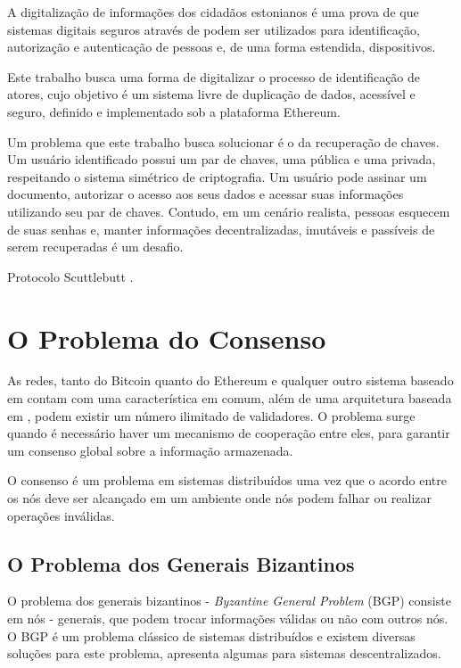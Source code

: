 \documentclass[tcc,capa]{texufpel}
\begin{document}
    A digitalização de informações dos cidadãos estonianos é uma prova de que sistemas digitais seguros através de \bchain podem ser utilizados para identificação, autorização e autenticação de pessoas e, de uma forma estendida, dispositivos.
    
    Este trabalho busca uma forma de digitalizar o processo de identificação de atores, cujo objetivo é um sistema livre de duplicação de dados, acessível e seguro, definido e implementado sob a plataforma Ethereum.
    
    Um problema que este trabalho busca solucionar é o da recuperação de chaves. Um usuário identificado possui um par de chaves, uma pública e uma privada, respeitando o sistema simétrico de criptografia. Um usuário pode assinar um documento, autorizar o acesso aos seus dados e acessar suas informações utilizando seu par de chaves. Contudo, em um cenário realista, pessoas esquecem de suas senhas e, manter informações decentralizadas, imutáveis e passíveis de serem recuperadas é um desafio.
    
    Protocolo Scuttlebutt \cite{vanRenesse:2008:ERF:1529974.1529983}.
	
\section{O Problema do Consenso}\label{sc:problema-do-consenso}

    As redes, tanto do Bitcoin quanto do Ethereum e qualquer outro sistema baseado em \bchain contam com uma característica em comum, além de uma arquitetura baseada em \bchain, podem existir um número ilimitado de validadores. O problema surge quando é necessário haver um mecanismo de cooperação entre eles, para garantir um consenso global sobre a informação armazenada.
    
    O consenso é um problema em sistemas distribuídos uma vez que o acordo entre os nós deve ser alcançado em um ambiente onde nós podem falhar ou realizar operações inválidas.
        
    \subsection{O Problema dos Generais Bizantinos}\label{ssc:bgp}
    
    O problema dos generais bizantinos - \textit{Byzantine General Problem} (BGP) consiste em nós - generais, que podem trocar informações válidas ou não com outros nós. O BGP é um problema clássico de sistemas distribuídos e existem diversas soluções para este problema, \cite{coulouris} apresenta algumas para sistemas descentralizados.
    
\end{document}
